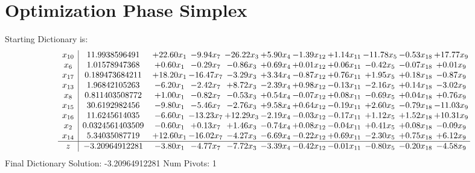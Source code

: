 \documentclass[9pt]{article}
\begin{document}
\section{Optimization Phase Simplex}
Starting Dictionary is:
\[\begin{array}{c| c c@{\hskip 2pt} c@{\hskip 2pt} c@{\hskip 2pt} c@{\hskip 2pt} c@{\hskip 2pt} c@{\hskip 2pt} c@{\hskip 2pt} c@{\hskip 2pt} c@{\hskip 2pt} }
 x_{10}   &  11.9938596491 & + 22.60 x_{1} & -9.94 x_{7} & -26.22 x_{3} & +  5.90 x_{4} & -1.39 x_{12} & +  1.14 x_{11} & -11.78 x_{5} & -0.53 x_{18} & + 17.77 x_{9}\\
 x_{6}   &  1.01578947368 & +  0.60 x_{1} & -0.29 x_{7} & -0.86 x_{3} & +  0.69 x_{4} & +  0.01 x_{12} & +  0.06 x_{11} & -0.42 x_{5} & -0.07 x_{18} & +  0.01 x_{9}\\
 x_{17}   &  0.189473684211 & + 18.20 x_{1} & -16.47 x_{7} & -3.29 x_{3} & +  3.34 x_{4} & -0.87 x_{12} & +  0.76 x_{11} & +  1.95 x_{5} & +  0.18 x_{18} & -0.87 x_{9}\\
 x_{13}   &  1.96842105263 & -6.20 x_{1} & -2.42 x_{7} & +  8.72 x_{3} & -2.39 x_{4} & +  0.98 x_{12} & -0.13 x_{11} & -2.16 x_{5} & +  0.14 x_{18} & -3.02 x_{9}\\
 x_{8}   &  0.811403508772 & +  1.00 x_{1} & -0.82 x_{7} & -0.53 x_{3} & +  0.54 x_{4} & -0.07 x_{12} & +  0.08 x_{11} & -0.69 x_{5} & +  0.04 x_{18} & +  0.76 x_{9}\\
 x_{15}   &  30.6192982456 & -9.80 x_{1} & -5.46 x_{7} & -2.76 x_{3} & +  9.58 x_{4} & +  0.64 x_{12} & -0.19 x_{11} & +  2.60 x_{5} & -0.79 x_{18} & -11.03 x_{9}\\
 x_{16}   &  11.6245614035 & -6.60 x_{1} & -13.23 x_{7} & + 12.29 x_{3} & -2.19 x_{4} & -0.03 x_{12} & -0.17 x_{11} & +  1.12 x_{5} & +  1.52 x_{18} & + 10.31 x_{9}\\
 x_{2}   &  0.0324561403509 & -0.60 x_{1} & +  0.13 x_{7} & +  1.46 x_{3} & -0.74 x_{4} & +  0.08 x_{12} & -0.04 x_{11} & +  0.41 x_{5} & +  0.08 x_{18} & -0.09 x_{9}\\
 x_{14}   &  5.34035087719 & + 12.60 x_{1} & -16.02 x_{7} & -4.27 x_{3} & -6.69 x_{4} & -0.22 x_{12} & +  0.69 x_{11} & -2.30 x_{5} & +  0.75 x_{18} & +  6.12 x_{9}\\
\hline
z    &  -3.20964912281 & -3.80 x_{1} & -4.77 x_{7} & -7.72 x_{3} & -3.39 x_{4} & -0.42 x_{12} & -0.01 x_{11} & -0.80 x_{5} & -0.20 x_{18} & -4.58 x_{9}\\
\end{array}\]
Final Dictionary
Solution:  -3.20964912281
Num Pivots:  1
\end{document}
